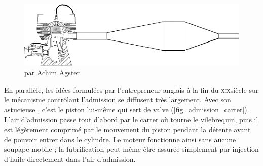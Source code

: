 	\begin{figure}
		\begin{center}
			\includegraphics[width=\textwidth]{images/pot_detente_accorde.png}
			{ \ccbysa par Achim Agster}
			\label{fig_pot_detente_accorde}
		\end{center}
	\end{figure}
	
	En parallèle, les idées formulées par l’entrepreneur anglais  à la fin du \textsc{xix}\ieme siècle sur le mécanisme contrôlant l’admission se diffusent très largement. Avec son astucieuse , c’est le piston lui-même qui sert de valve (\cref{fig_admission_carter}). L’air d’admission passe tout d’abord par le carter où tourne le vilebrequin, puis il est légèrement comprimé par le mouvement du piston pendant la détente avant de pouvoir entrer dans le cylindre. Le moteur fonctionne ainsi sans aucune soupape mobile ; la lubrification peut même être assurée simplement par injection d’huile directement dans l’air d’admission.
	
